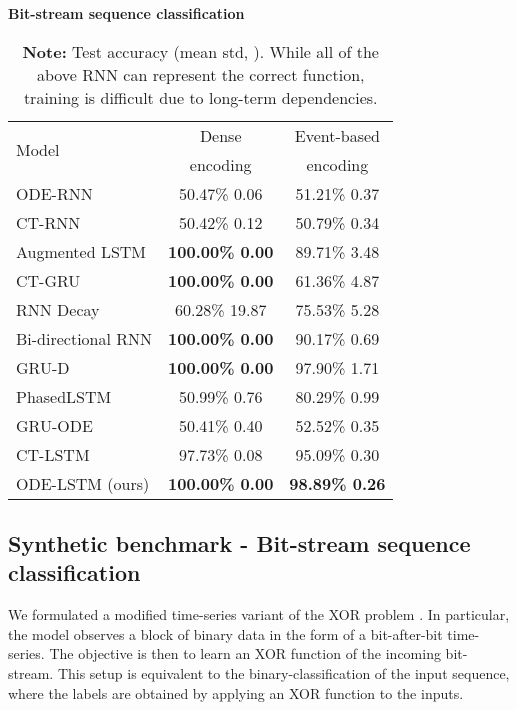 \documentclass{article}
\makeatletter
\def\adl@drawiv#1#2#3{\hskip.5\tabcolsep
    \xleaders#3{#2.5\@tempdimb #1{1}#2.5\@tempdimb}#2\z@ plus1fil minus1fil\relax
    \hskip.5\tabcolsep}
\newcommand{\cdashlinelr}[1]{\noalign{\vskip\aboverulesep
        \global\let\@dashdrawstore\adl@draw
        \global\let\adl@draw\adl@drawiv}
    \cdashline{#1}
    \noalign{\global\let\adl@draw\@dashdrawstore
        \vskip\belowrulesep}}
\makeatother
\begin{document}
\begin{table}[b]
    \centering
    \caption{\textbf{Bit-stream sequence classification}}
    \begin{tabular}{lcc}
    \toprule
        \multirow{2}{*}{Model} & Dense & Event-based  \\
                               & encoding  & encoding\\
        \hline
        ODE-RNN  & 50.47\%  0.06 & 51.21\%  0.37 \\
        CT-RNN & 50.42\%  0.12 & 50.79\%  0.34 \\
        Augmented LSTM  & \textbf{100.00\%  0.00} & 89.71\%  3.48 \\
        CT-GRU  & \textbf{100.00\%  0.00} & 61.36\%  4.87 \\
        RNN Decay  & 60.28\%  19.87 & 75.53\%  5.28 \\
        Bi-directional RNN   & \textbf{100.00\%  0.00} & 90.17\%  0.69 \\
        GRU-D   & \textbf{100.00\%  0.00} & {97.90}\%  1.71 \\
        PhasedLSTM   & 50.99\%  0.76 & 80.29\%  0.99 \\
        GRU-ODE & 50.41\%  0.40 & 52.52\%  0.35\\   
        CT-LSTM & 97.73\%  0.08 & 95.09\%  0.30\\
        \cdashlinelr{1-3}
        ODE-LSTM (ours)  & \textbf{100.00\%  0.00} & \textbf{98.89\%  0.26} \\
        \bottomrule
    \end{tabular}
    \caption*{\footnotesize \textbf{Note:} Test accuracy (mean  std, ). While all of the above RNN can represent the correct function, training is difficult due to long-term dependencies.}
    \label{tab:synthetic}
\end{table}
\subsection{Synthetic benchmark - Bit-stream sequence classification}
We formulated a modified time-series variant of the XOR problem \cite{marvin1969perceptrons}. In particular, the model observes a block of binary data in the form of a bit-after-bit time-series. The objective is then to learn an XOR function of the incoming bit-stream. This setup is equivalent to the binary-classification of the input sequence, where the labels are obtained by applying an XOR function to the inputs. 
\end{document}
